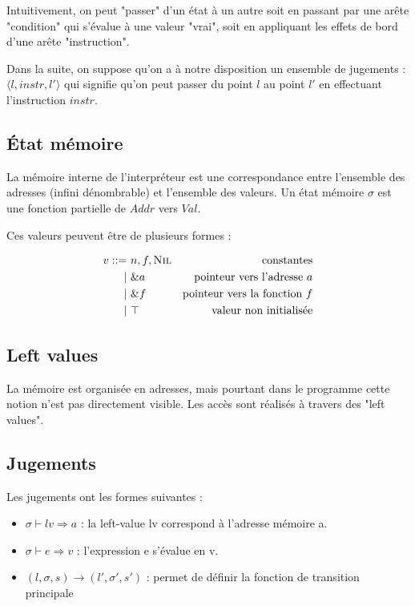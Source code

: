 \documentclass{article}
\newcommand{\cNil}{\textsc{Nil}}
\begin{document}
Intuitivement, on peut "passer" d'un état à un autre soit en passant par une
arête "condition" qui s'évalue à une valeur "vrai", soit en appliquant les
effets de bord d'une arête "instruction".

Dans la suite, on suppose qu'on a à notre disposition un ensemble de jugements :
$\langle l, instr, l' \rangle$ qui signifie qu'on peut passer du point $l$ au
point $l'$ en effectuant l'instruction $instr$.

\subsection{État mémoire}

La mémoire interne de l'interpréteur est une correspondance entre l'ensemble des
adresses (infini dénombrable) et l'ensemble des valeurs. Un état mémoire $σ$ est
une fonction partielle de $Addr$ vers $Val$.

Ces valeurs peuvent être de plusieurs formes :

\begin{align*}
v   ::=~ & n, f, \cNil & \text{constantes}\\
      |~ & \&a         & \text{pointeur vers l'adresse $a$}\\
      |~ & \&f         & \text{pointeur vers la fonction $f$}\\
      |~ & \top        & \text{valeur non initialisée}
\end{align*}


\subsection{Left values}

La mémoire est organisée en adresses, mais pourtant dans le programme cette
notion n'est pas directement visible. Les accès sont réalisés à travers des
"left values".

\subsection{Jugements}

Les jugements ont les formes suivantes :

\begin{itemize}

\item $σ ⊢ lv ⇒ a$ :
  la left-value lv correspond à l'adresse mémoire a.

\item $σ ⊢ e ⇒ v$ :
  l'expression e s'évalue en v.

\item $(l, σ, s) → (l', σ', s')$ :
  permet de définir la fonction de transition principale

\end{itemize}
\end{document}
